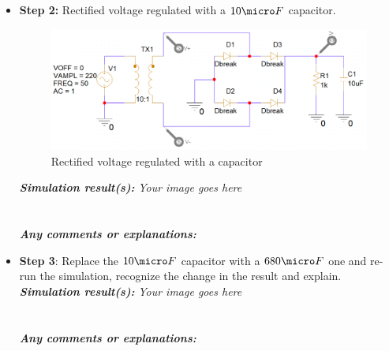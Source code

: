 \begin{itemize}
    \item \textbf{Step 2:} Rectified voltage regulated with a $10\micro F$ capacitor.
          \begin{figure}[H]
              \centering
              \includegraphics[width=\linewidth]{source/content/lab2_ex9_step2.png}
              \caption{Rectified voltage regulated with a capacitor}
              \label{lab2_ex9_step2}
          \end{figure}
          \textit{\textbf{Simulation result(s):}} \textit{Your image goes here}\\
          \\
          \vspace{8cm}
          \\
          \textbf{\textit{Any comments or explanations:}}
          \dotfill\bigskip\par\mbox{}\dotfill
          \dotfill\bigskip\par\mbox{}\dotfill
          \dotfill\bigskip\par\mbox{}\dotfill
          \dotfill\bigskip\par\mbox{}\dotfill
          \dotfill\bigskip\par\mbox{}\dotfill
          \dotfill\bigskip\par\mbox{}\dotfill
    \item \textbf{Step 3}: Replace the $10\micro F$ capacitor with a $680\micro F$ one and re-run the simulation, recognize the change in the result and explain.\\
          \textit{\textbf{Simulation result(s):}} \textit{Your image goes here}\\
          \\
          \vspace{6cm}
          \\
          \textbf{\textit{Any comments or explanations:}}
          \dotfill\bigskip\par\mbox{}\dotfill
          \dotfill\bigskip\par\mbox{}\dotfill

\end{itemize}

